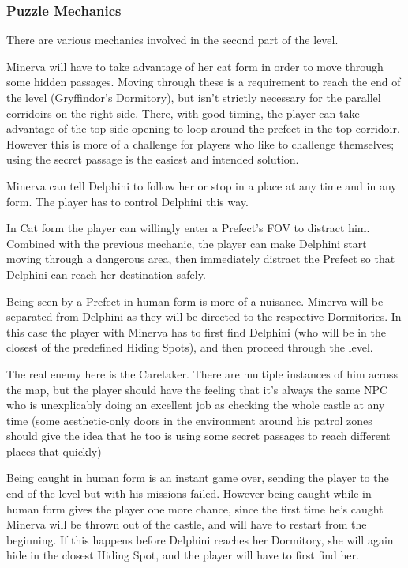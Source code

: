 \subsubsection{Puzzle Mechanics}

There are various mechanics involved in the second part of the level.

Minerva will have to take advantage of her cat form in order to move through some hidden passages. Moving through these is a requirement to reach the end of the level (Gryffindor's Dormitory), but isn't strictly necessary for the parallel corridoirs on the right side. There, with good timing, the player can take advantage of the top-side opening to loop around the prefect in the top corridoir. However this is more of a challenge for players who like to challenge themselves; using the secret passage is the easiest and intended solution.

Minerva can tell Delphini to follow her or stop in a place at any time and in any form. The player has to control Delphini this way. 

In Cat form the player can willingly enter a Prefect's FOV to distract him. Combined with the previous mechanic, the player can make Delphini start moving through a dangerous area, then immediately distract the Prefect so that Delphini can reach her destination safely.

Being seen by a Prefect in human form is more of a nuisance. Minerva will be separated from Delphini as they will be directed to the respective Dormitories. In this case the player with Minerva has to first find Delphini (who will be in the closest of the predefined Hiding Spots), and then proceed through the level.

The real enemy here is the Caretaker. There are multiple instances of him across the map, but the player should have the feeling that it's always the same NPC who is unexplicably doing an excellent job as checking the whole castle at any time (some aesthetic-only doors in the environment around his patrol zones should give the idea that he too is using some secret passages to reach different places that quickly)

Being caught in human form is an instant game over, sending the player to the end of the level but with his missions failed. However being caught while in human form gives the player one more chance, since the first time he's caught Minerva will be thrown out of the castle, and will have to restart from the beginning. If this happens before Delphini reaches her Dormitory, she will again hide in the closest Hiding Spot, and the player will have to first find her.

